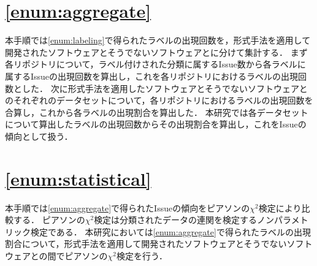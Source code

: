 \documentclass[main]{subfiles}
\begin{document}
\section{\ref{enum:aggregate}}
\label{sec:aggregate}

本手順では\ref{enum:labeling}で得られたラベルの出現回数を，形式手法を適用して開発されたソフトウェアとそうでないソフトウェアとに分けて集計する．
まず各リポジトリについて，ラベル付けされた分類に属するIssue数から各ラベルに属するIssueの出現回数を算出し，これを各リポジトリにおけるラベルの出現回数とした．
次に形式手法を適用したソフトウェアとそうでないソフトウェアとのそれぞれのデータセットについて，各リポジトリにおけるラベルの出現回数を合算し，これから各ラベルの出現割合を算出した．
本研究では各データセットについて算出したラベルの出現回数からその出現割合を算出し，これをIssueの傾向として扱う．

\section{\ref{enum:statistical}}
\label{sec:statistical}

本手順では\ref{enum:aggregate}で得られたIssueの傾向をピアソンの\(\chi^2\)検定により比較する．
ピアソンの\(\chi^2\)検定は分類されたデータの連関を検定するノンパラメトリック検定である．
本研究においては\ref{enum:aggregate}で得られたラベルの出現割合について，形式手法を適用して開発されたソフトウェアとそうでないソフトウェアとの間でピアソンの\(\chi^2\)検定を行う．
\end{document}
